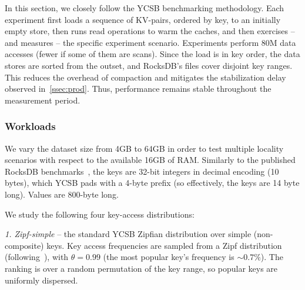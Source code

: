 In this section, we closely follow the YCSB benchmarking methodology. 
Each experiment first  loads a sequence of KV-pairs, ordered by key, to an initially empty store, then  
runs read operations to warm the caches, and then exercises -- and measures --  the specific experiment 
scenario. Experiments perform 80M data accesses (fewer if some of them are scans). 
Since the load is in key order, the data stores are sorted from the outset, and RocksDB's files cover disjoint key ranges. 
This reduces the overhead of compaction and mitigates the stabilization delay observed in~\cref{ssec:prod}.  Thus, 
performance remains stable throughout the measurement period.

\subsubsection{Workloads}

We vary the dataset size from 4GB to 64GB in order to test multiple locality 
scenarios with respect to the available 16GB of RAM. Similarly to the published RocksDB benchmarks~\cite{RocksDBPerf}, 
the keys are 32-bit integers in decimal encoding (10 bytes), which YCSB pads with a 4-byte prefix (so effectively, 
the keys are 14 byte long). Values are 800-byte long. 


\noindent
We study the following four key-access distributions:  

\emph{1. Zipf-simple} -- the standard YCSB Zipfian distribution over simple (non-composite) keys. 
Key access frequencies are sampled from a Zipf distribution 
(following~\cite{Gray:1994:QGB:191839.191886}), with $\theta = 0.99$
(the most popular key's frequency is  $\sim 0.7\%$). 
The ranking is over a random permutation of the key range, so popular keys are uniformly dispersed. %

